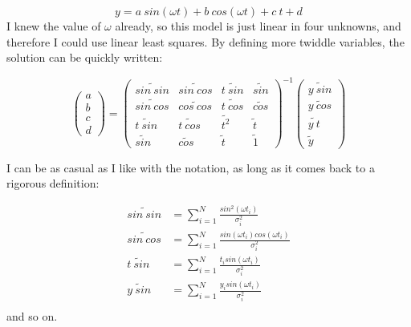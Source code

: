 \documentclass[letterpaper,12pt]{article}
\begin{document}
\begin{equation} \label{eq.sincosmodel}
y = a\ sin(\omega t)+ b\ cos(\omega t)+c\ t + d
\end{equation}
I knew the value of $\omega$ already, so this model is just linear in four unknowns, and therefore I could use linear least squares. By defining more twiddle variables, the solution can be quickly written:

\begin{equation} \label{eq.sincos}
\begin{pmatrix}
a \\
b \\
c \\
d
\end{pmatrix} =
\begin{pmatrix}
\widetilde{sin\ sin} & \widetilde{sin\ cos} & \widetilde{t\ sin} & \widetilde{sin} \\
\widetilde{sin\ cos} & \widetilde{cos\ cos} & \widetilde{t\ cos} & \widetilde{cos} \\
\widetilde{t\ sin} & \widetilde{t\ cos} & \widetilde{t^2} & \widetilde{t} \\
\widetilde{sin} & \widetilde{cos} & \widetilde{t} & \widetilde{1} 
\end{pmatrix} ^{-1}
\begin{pmatrix}
\widetilde{y\ sin}  \\
\widetilde{y\ cos}  \\
\widetilde{y\ t}  \\
\widetilde{y}
\end{pmatrix}
\end{equation}

I can be as casual as I like with the notation, as long as it comes back to a rigorous definition:

\begin{equation}
\begin{aligned}
\label{twiddle3}
\widetilde{sin\ sin}&=\sum_{i=1}^N \frac{sin^2(\omega t_i)}{\sigma_i^2}\\
\widetilde{sin\ cos}&=\sum_{i=1}^N \frac{sin(\omega t_i)cos(\omega t_i)}{\sigma_i^2}\\
\widetilde{t\ sin}&=\sum_{i=1}^N \frac{t_i sin(\omega t_i)}{\sigma_i^2}\\
\widetilde{y\ sin}&=\sum_{i=1}^N \frac{y_i sin(\omega t_i)}{\sigma_i^2}\\
\end{aligned}
\end{equation}
and so on.
\end{document}
